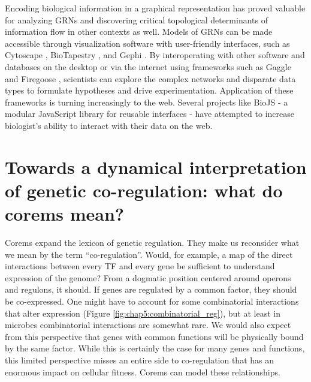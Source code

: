 Encoding biological information in a graphical representation has proved valuable for analyzing GRNs and discovering critical topological determinants of information flow in other contexts as well. Models of GRNs can be made accessible through visualization software with user-friendly interfaces, such as Cytoscape \cite{shannon_cytoscape:_2003}, BioTapestry \cite{longabaugh_computational_2005}, and Gephi \cite{bastian_gephi:_2009}.  By interoperating with other software and databases on the desktop or via the internet using frameworks such as Gaggle \cite{shannon_gaggle:_2006} and Firegoose \cite{bare_firegoose:_2007}, scientists can explore the complex networks and disparate data types to formulate hypotheses and drive experimentation. Application of these frameworks is turning increasingly to the web. Several projects like BioJS \cite{gomez_biojs:_2013} - a modular JavaScript library for reusable interfaces - have attempted to increase biologist's ability to interact with their data on the web.

\section{Towards a dynamical interpretation of genetic co-regulation: what do corems mean?}

Corems expand the lexicon of genetic regulation. They make us reconsider what we mean by the term ``co-regulation''. Would, for example, a map of the direct interactions between every TF and every gene be sufficient to understand expression of the genome? From a dogmatic position centered around operons and regulons, it should. If genes are regulated by a common factor, they should be co-expressed. One might have to account for some combinatorial interactions that alter expression (Figure \ref{fig:chap5:combinatorial_reg}), but at least in microbes combinatorial interactions are somewhat rare. We would also expect from this perspective that genes with common functions will be physically bound by the same factor. While this is certainly the case for many genes and functions, this limited perspective misses an entire side to co-regulation that has an enormous impact on cellular fitness. Corems can model these relationships.   

